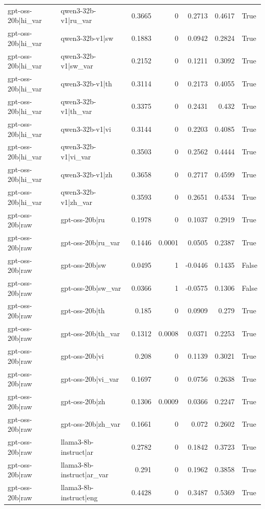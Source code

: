 \begin{table}
\begin{tabular}{l l r r r r l}
gpt-oss-20b|hi_var & qwen3-32b-v1|ru_var & 0.3665 & 0 & 0.2713 & 0.4617 & True \\
gpt-oss-20b|hi_var & qwen3-32b-v1|sw & 0.1883 & 0 & 0.0942 & 0.2824 & True \\
gpt-oss-20b|hi_var & qwen3-32b-v1|sw_var & 0.2152 & 0 & 0.1211 & 0.3092 & True \\
gpt-oss-20b|hi_var & qwen3-32b-v1|th & 0.3114 & 0 & 0.2173 & 0.4055 & True \\
gpt-oss-20b|hi_var & qwen3-32b-v1|th_var & 0.3375 & 0 & 0.2431 & 0.432 & True \\
gpt-oss-20b|hi_var & qwen3-32b-v1|vi & 0.3144 & 0 & 0.2203 & 0.4085 & True \\
gpt-oss-20b|hi_var & qwen3-32b-v1|vi_var & 0.3503 & 0 & 0.2562 & 0.4444 & True \\
gpt-oss-20b|hi_var & qwen3-32b-v1|zh & 0.3658 & 0 & 0.2717 & 0.4599 & True \\
gpt-oss-20b|hi_var & qwen3-32b-v1|zh_var & 0.3593 & 0 & 0.2651 & 0.4534 & True \\
gpt-oss-20b|raw & gpt-oss-20b|ru & 0.1978 & 0 & 0.1037 & 0.2919 & True \\
gpt-oss-20b|raw & gpt-oss-20b|ru_var & 0.1446 & 0.0001 & 0.0505 & 0.2387 & True \\
gpt-oss-20b|raw & gpt-oss-20b|sw & 0.0495 & 1 & -0.0446 & 0.1435 & False \\
gpt-oss-20b|raw & gpt-oss-20b|sw_var & 0.0366 & 1 & -0.0575 & 0.1306 & False \\
gpt-oss-20b|raw & gpt-oss-20b|th & 0.185 & 0 & 0.0909 & 0.279 & True \\
gpt-oss-20b|raw & gpt-oss-20b|th_var & 0.1312 & 0.0008 & 0.0371 & 0.2253 & True \\
gpt-oss-20b|raw & gpt-oss-20b|vi & 0.208 & 0 & 0.1139 & 0.3021 & True \\
gpt-oss-20b|raw & gpt-oss-20b|vi_var & 0.1697 & 0 & 0.0756 & 0.2638 & True \\
gpt-oss-20b|raw & gpt-oss-20b|zh & 0.1306 & 0.0009 & 0.0366 & 0.2247 & True \\
gpt-oss-20b|raw & gpt-oss-20b|zh_var & 0.1661 & 0 & 0.072 & 0.2602 & True \\
gpt-oss-20b|raw & llama3-8b-instruct|ar & 0.2782 & 0 & 0.1842 & 0.3723 & True \\
gpt-oss-20b|raw & llama3-8b-instruct|ar_var & 0.291 & 0 & 0.1962 & 0.3858 & True \\
gpt-oss-20b|raw & llama3-8b-instruct|eng & 0.4428 & 0 & 0.3487 & 0.5369 & True \\

\end{tabular}
\end{table}
